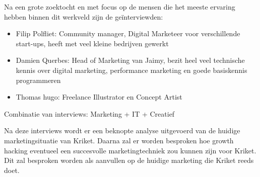 Na een grote zoektocht en met focus op de mensen die het meeste ervaring hebben binnen dit werkveld zijn de geïnterviewden:
\begin{itemize} 
	\item Filip Polfliet: Community manager, Digital Marketeer voor verschillende start-ups, heeft met veel kleine bedrijven gewerkt
	\item Damien Querbes: Head of Marketing van Jaimy, bezit heel veel technische kennis over digital marketing, performance marketing en goede basiskennis programmeren
	\item Thomas hugo: Freelance Illustrator en Concept Artist
\end{itemize}

Combinatie van interviews: Marketing + IT + Creatief 

Na deze interviews wordt er een beknopte analyse uitgevoerd van de huidige marketingsituatie van Kriket. Daarna zal er worden besproken hoe growth hacking eventueel een succesvolle marketingtechniek zou kunnen zijn voor Kriket. Dit zal besproken worden als aanvullen op de huidige marketing die Kriket reeds doet.
